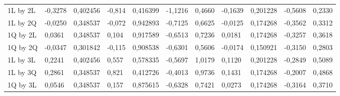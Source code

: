 \begin{table}[H]
{\begin{tabular}{lllllllllll}
\rowcolor[HTML]{FFFFFF} 
1L by 2L       & -0,3278                         & 0,402456                        & -0,814                          & 0,416399                        & -1,1216                         & 0,4660                          & -0,1639                         & 0,201228                        & -0,5608                         & 0,2330                          \\
\rowcolor[HTML]{FFFFFF} 
1L by 2Q       & -0,0250                         & 0,348537                        & -0,072                          & 0,942893                        & -0,7125                         & 0,6625                          & -0,0125                         & 0,174268                        & -0,3562                         & 0,3312                          \\
\rowcolor[HTML]{FFFFFF} 
1Q by 2L       & 0,0361                          & 0,348537                        & 0,104                           & 0,917589                        & -0,6513                         & 0,7236                          & 0,0181                          & 0,174268                        & -0,3257                         & 0,3618                          \\
\rowcolor[HTML]{FFFFFF} 
1Q by 2Q       & -0,0347                         & 0,301842                        & -0,115                          & 0,908538                        & -0,6301                         & 0,5606                          & -0,0174                         & 0,150921                        & -0,3150                         & 0,2803                          \\
\rowcolor[HTML]{FFFFFF} 
1L by 3L       & 0,2241                          & 0,402456                        & 0,557                           & 0,578335                        & -0,5697                         & 1,0179                          & 0,1120                          & 0,201228                        & -0,2849                         & 0,5089                          \\
\rowcolor[HTML]{FFFFFF} 
1L by 3Q       & 0,2861                          & 0,348537                        & 0,821                           & 0,412726                        & -0,4013                         & 0,9736                          & 0,1431                          & 0,174268                        & -0,2007                         & 0,4868                          \\
\rowcolor[HTML]{FFFFFF} 
1Q by 3L       & 0,0546                          & 0,348537                        & 0,157                           & 0,875615                        & -0,6328                         & 0,7421                          & 0,0273                          & 0,174268                        & -0,3164                         & 0,3710                          \\

\end{tabular}}
\end{table}
